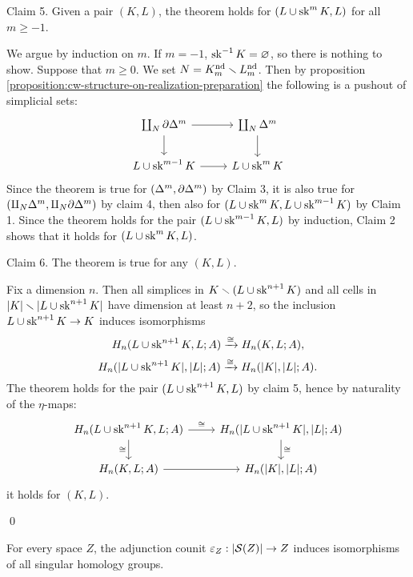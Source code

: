 

Claim 5. Given a pair $(K,L)$, the theorem holds for $(L\cup\sk^m K,L)$ for all $m\ge-1$.

\begin{claimproof}
We argue by induction on $m$. If $m=-1$, $\sk^\inv K=\emptyset$, so there is nothing to show. Suppose that $m\ge0$. We set $N=K^\text{nd}_m\sm L^\text{nd}_m$. Then by proposition \ref{proposition:cw-structure-on-realization-preparation} the following is a pushout of simplicial sets:
\[
\begin{tikzcd}
\coprod_N\de\Delta^m \ar[d] \ar[r] & \coprod_N\Delta^m \ar[d]\\
L\cup\sk^{m-1}K \ar[r] & L\cup\sk^mK
\end{tikzcd}
\]
Since the theorem is true for $(\Delta^m,\de\Delta^m)$ by Claim 3, it is also true for $(\amalg_N\Delta^m,\amalg_N\de\Delta^m)$ by claim 4, then also for $(L\cup\sk^m K,L\cup\sk^{m-1}K)$ by Claim 1. Since the theorem holds for the pair $(L\cup\sk^{m-1}K,L)$ by induction, Claim 2 shows that it holds for $(L\cup\sk^mK,L)$.
\end{claimproof}

Claim 6. The theorem is true for any $(K,L)$.

\begin{claimproof}
Fix a dimension $n$. Then all simplices in $K\sm(L\cup\sk^{n+1}K)$ and all cells in $|K|\sm|L\cup\sk^{n+1}K|$ have dimension at least $n+2$, so the inclusion $L\cup\sk^{n+1}K\to K$ induces isomorphisms
\[H_n(L\cup\sk^{n+1} K,L;A)\xto{\cong}H_n(K,L;A),\] \[H_n(|L\cup\sk^{n+1} K|,|L|;A)\xto{\cong}H_n(|K|,|L|;A).\]
The theorem holds for the pair $(L\cup\sk^{n+1}K,L)$ by claim 5, hence by naturality of the $\eta$-maps:
\[
\begin{tikzcd}
H_n(L\cup\sk^{n+1}K,L;A) \ar[d,"\cong"'] \ar[r,"\cong"] & H_n(|L\cup\sk^{n+1}K|,|L|;A) \ar[d,"\cong"]\\
H_n(K,L;A) \ar[r] & H_n(|K|,|L|;A)
\end{tikzcd}
\]
it holds for $(K,L)$.
\end{claimproof}\qed

\begin{corollary}\label{corollary:adjunction-counit-is-a-weak-equivalence}
For every space $Z$, the adjunction counit $\epsilon_Z:|\S(Z)|\to Z$ induces isomorphisms of all singular homology groups.
\end{corollary}

